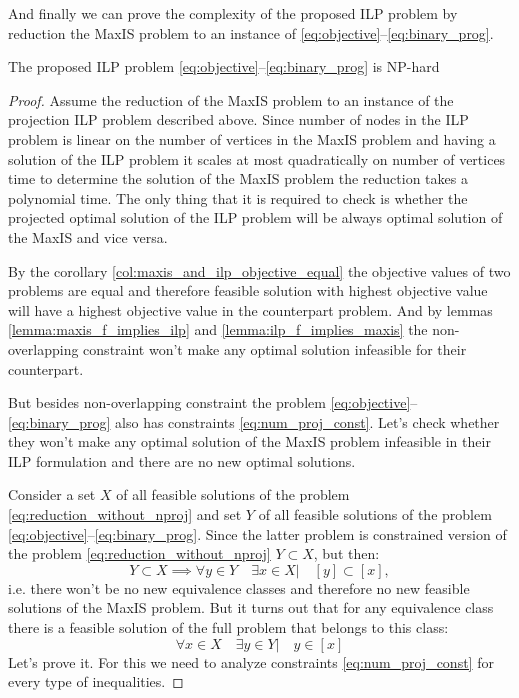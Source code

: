 And finally we can prove the complexity of the proposed ILP problem by reduction the MaxIS problem
to an instance of \eqref{eq:objective}--\eqref{eq:binary_prog}.
\begin{theorem}
  The proposed ILP problem \eqref{eq:objective}--\eqref{eq:binary_prog} is NP-hard
\end{theorem}
\begin{proof}
  Assume the reduction of the MaxIS problem to an instance of the projection ILP problem described above.
  Since number of nodes in the ILP problem is linear on the number of vertices in the MaxIS problem and
  having a solution of the ILP problem it scales at most quadratically on number of vertices time to
  determine the solution of the MaxIS problem the reduction takes a polynomial time.
  The only thing that it is required to check is whether the projected optimal solution of the ILP problem
  will be always optimal solution of the MaxIS and vice versa.

  By the corollary \ref{col:maxis_and_ilp_objective_equal} the objective values of two problems are equal and therefore
  feasible solution with highest objective value will have a highest objective value in the counterpart problem.
  And by lemmas \ref{lemma:maxis_f_implies_ilp} and \ref{lemma:ilp_f_implies_maxis} the non-overlapping constraint
  won't make any optimal solution infeasible for their counterpart.

  But besides non-overlapping constraint the problem \eqref{eq:objective}--\eqref{eq:binary_prog} also has
  constraints \eqref{eq:num_proj_const}. Let's check whether they won't make any optimal solution of the MaxIS
  problem infeasible in their ILP formulation and there are no new optimal solutions.

  Consider a set \( X \) of all feasible solutions of the problem \eqref{eq:reduction_without_nproj} and
  set \( Y \) of all feasible solutions of the problem \eqref{eq:objective}--\eqref{eq:binary_prog}. Since
  the latter problem is constrained version of the problem \eqref{eq:reduction_without_nproj} \( Y \subset X \), but then:
  \[
    Y \subset X \implies \forall y \in Y \quad \exists x \in X \Big| \quad [y] \subset [x],
  \]
  i.e. there won't be no new equivalence classes and therefore no new feasible solutions of the MaxIS problem.
  But it turns out that for any equivalence class there is a feasible solution of the full problem that belongs to this class:
  \[
    \forall x \in X \quad \exists y \in Y \Big| \quad y \in [x]
  \]
  Let's prove it. For this we need to analyze constraints \eqref{eq:num_proj_const} for every type of inequalities.


\end{proof}
